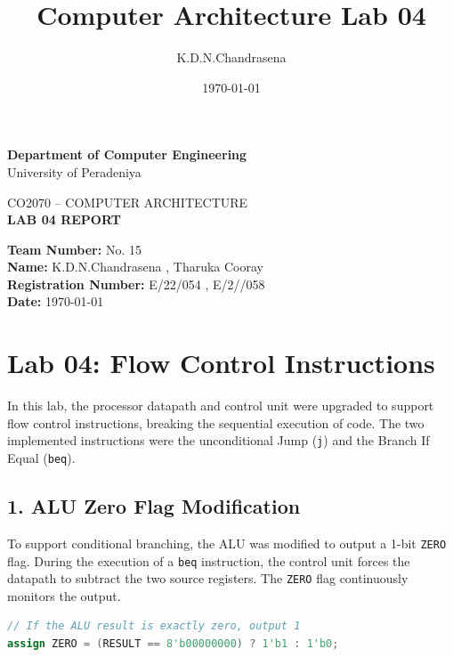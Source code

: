 \documentclass[12pt,a4paper]{article}
\title{Computer Architecture Lab 04}
\author{K.D.N.Chandrasena}
\date{\today}
\begin{document}
\begin{center}
{\Large \textbf{Department of Computer Engineering}}\\
\vspace{0.2cm}
{\large University of Peradeniya}\\
\vspace{0.6cm}

{\large CO2070 -- COMPUTER ARCHITECTURE}\\
\vspace{0.3cm}
{\Large \textbf{LAB 04 REPORT}}\\
\vspace{0.2cm}

\end{center}
{\large
\textbf{Team Number:} No. 15\\[0.3cm]
\textbf{Name:} K.D.N.Chandrasena , Tharuka Cooray\\[0.3cm]
\textbf{Registration Number:} E/22/054 , E/2//058\\[0.3cm]
\textbf{Date:} \today
}

\vspace{1cm}

\section*{Lab 04: Flow Control Instructions}

In this lab, the processor datapath and control unit were upgraded to support flow control instructions, breaking the sequential execution of code. The two implemented instructions were the unconditional Jump (\texttt{j}) and the Branch If Equal (\texttt{beq}).

\subsection*{1. ALU Zero Flag Modification}
To support conditional branching, the ALU was modified to output a 1-bit \texttt{ZERO} flag. During the execution of a \texttt{beq} instruction, the control unit forces the datapath to subtract the two source registers. The \texttt{ZERO} flag continuously monitors the output.

\begin{lstlisting}[language=Verilog, caption=ALU Zero Flag Logic]
// If the ALU result is exactly zero, output 1
assign ZERO = (RESULT == 8'b00000000) ? 1'b1 : 1'b0;
\end{lstlisting}
\end{document}
